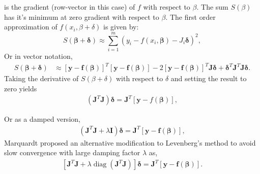 \documentclass[20pt, a4paper]{report}
\begin{document}
		 is the gradient (row-vector in this case) of $f$ with respect to $\beta$.
		 The sum $S(\beta)$ has it's minimum at zero gradient with respect to $\beta$. The first order approximation of $f(x_{i},\beta+\delta)$ is given by:\begin{equation*}
		 {\displaystyle S({\boldsymbol {\beta }}+{\boldsymbol {\delta }})\approx \sum _{i=1}^{m}\left(y_{i}-f(x_{i},{\boldsymbol {\beta }})-J_{i}{\boldsymbol {\delta }}\right)^{2},}
\end{equation*}		  
	Or in vector notation,\begin{equation*}
	{\displaystyle {\begin{aligned}S({\boldsymbol {\beta }}+{\boldsymbol {\delta }})&\approx [\mathbf {y} -\mathbf {f} ({\boldsymbol {\beta }})]^{T}[\mathbf {y} -\mathbf {f} ({\boldsymbol {\beta }})]-2[\mathbf {y} -\mathbf {f} ({\boldsymbol {\beta }})]^{T}\mathbf {J} {\boldsymbol {\delta }}+{\boldsymbol {\delta }}^{T}\mathbf {J} ^{T}\mathbf {J} {\boldsymbol {\delta }}.\end{aligned}}}
	\end{equation*}
	Taking the derivative of $S(\beta+\delta)$ with respect to $\delta$ and setting the result to zero yields \begin{align*}
	{\displaystyle (\mathbf {J} ^{T}\mathbf {J} ){\boldsymbol {\delta }}=\mathbf {J} ^{T}[\mathbf {y} -f({\boldsymbol {\beta }})],}
\end{align*}
	
	Or as a damped version, \begin{align*}
	{\displaystyle (\mathbf {J} ^{T}\mathbf {J} +\lambda \mathbf {I} ){\boldsymbol {\delta }}=\mathbf {J} ^{T}[\mathbf {y} -\mathbf {f} ({\boldsymbol {\beta }})],}
\end{align*}	
Marquardt proposed an alternative modification to Levenberg's method to avoid slow convergence with large damping factor $\lambda$ as,
\begin{align*}
{\displaystyle [\mathbf {J} ^{T}\mathbf {J} +\lambda \operatorname {diag} (\mathbf {J} ^{T}\mathbf {J} )]{\boldsymbol {\delta }}=\mathbf {J} ^{T}[\mathbf {y} -\mathbf {f} ({\boldsymbol {\beta }})].}
\end{align*}
\end{document}
